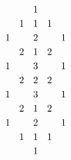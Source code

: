 \documentclass[border={10pt 10pt 10pt 10pt},varwidth]{standalone}
\begin{document}
\[\begin{tikzcd}[row sep={5mm,between origins},column sep={5mm,between origins}]
	&& 1&& \\%
	& 1 & 1 & 1 \\
	1 && 2 & {} & 1 \\
	& 2 & 1 & 2 \\
	1 && 3 && 1 \\
	& 2 & 2 & 2 \\
	1 && 3 && 1 \\
	& 2 & 1 & 2 \\
	1 && 2 && 1 \\
	& 1 & 1 & 1 \\
	&& 1
\end{tikzcd}\]
\end{document}
